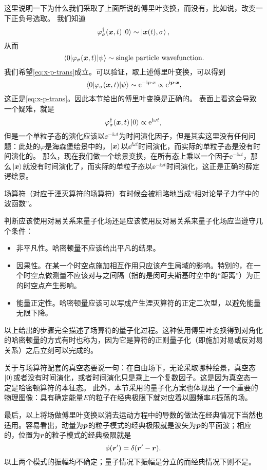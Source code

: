这里说明一下为什么我们采取了上面所说的傅里叶变换，而没有，比如说，改变一下正负号选取。
我们知道
\[
    \varphi^\dagger_\sigma (\vb*{x}, t) \ket{0} \sim \ket{\vb*{x}(t), \sigma},
\]
从而
\[
    \mel{0}{\varphi_\sigma (\vb*{x}, t)}{\psi} \sim \text{single particle wavefunction}.
\]
我们希望\eqref{eq:x-p-trans}成立。可以验证，取上述傅里叶变换，可以得到
\[
    \mel{0}{\varphi_\sigma (\vb*{x}, t)}{\psi} \sim \mathrm{e}^{-\mathrm{i} p \cdot x} \propto \mathrm{e}^{\mathrm{i} \vb*{p} \cdot \vb*{x}},
\]
这正是\eqref{eq:x-p-trans}。因此本节给出的傅里叶变换是正确的。
表面上看这会导致一个疑难，就是
\[
    \varphi^\dagger_\sigma (\vb*{x}, t) \ket{0} \propto \mathrm{e}^{\mathrm{i} \omega t},
\]
但是一个单粒子态的演化应该以$\ee^{-\ii \omega t}$为时间演化因子，但是其实这里没有任何问题：此处的$\varphi$是海森堡绘景中的，$\ket*{\vb*{x}}$以$\ee^{\ii \omega t}$时间演化，而实际的单粒子态是没有时间演化的。
那么，现在我们做一个绘景变换，在所有态上乘以一个因子$\ee^{-\ii \omega t}$，那么$\ket*{\vb*{x}}$就没有时间演化了，而实际的单粒子态以$\ee^{-\ii \omega t}$时间演化，这正是正确的薛定谔绘景。

场算符（对应于湮灭算符的场算符）有时候会被粗略地当成“相对论量子力学中的波函数”。

判断应该使用对易关系来量子化场还是应该使用反对易关系来量子化场应当遵守几个条件：
\begin{itemize}
    \item 非平凡性。哈密顿量不应该给出平凡的结果。
    \item 因果性。在某一个时空点施加相互作用只应该产生局域的影响。特别的，在一个时空点做测量不应该对与之间隔（指的是闵可夫斯基时空中的“距离”）为正的时空点产生影响。
    \item 能量正定性。哈密顿量应该可以写成产生湮灭算符的正定二次型，以避免能量无限下降。
\end{itemize}

以上给出的步骤完全描述了场算符的量子化过程。这种使用傅里叶变换得到对角化的哈密顿量的方式有时也称为，因为它是算符的正则量子化（即施加对易或反对易关系）之后立刻可以完成的。

关于与场算符配套的真空态要说一句：在自由场下，无论采取哪种绘景，真空态$\ket{0}$或者没有时间演化，或者时间演化只是乘上一个复数因子。这是因为真空态一定是哈密顿算符的本征态。
此外，本节采用的量子化方案也体现出了一个重要的物理图像：具有确定能量$E$的粒子在经典极限下就对应着以圆频率$E$振荡的场。

最后，以上将场做傅里叶变换以消去运动方程中的导数的做法在经典情况下当然也适用。容易看出，动量为$\vb*{p}$的粒子模式的经典极限就是波矢为$\vb*{p}$的平面波；相应的，位置为$\vb*{r}$的粒子模式的经典极限就是
\[
    \phi(\vb*{r}') = \delta(\vb*{r}' - \vb*{r}).
\]
以上两个模式的振幅均不确定；量子情况下振幅是分立的而经典情况下则不是。

